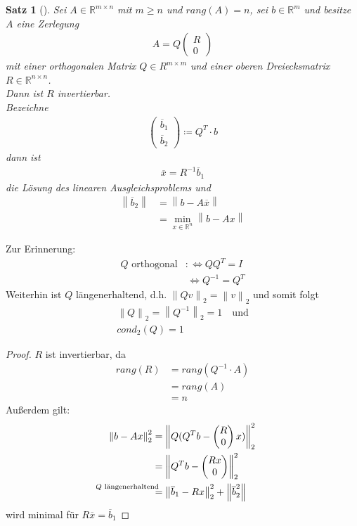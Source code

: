 \documentclass[ngerman,fontsize=11pt, paper=a4, parskip=half, titlepage=true, toc=bib]{scrbook}
\theoremstyle{definition}
\theoremstyle{plain}
\newtheorem{Satz}[Def]{Satz}		%
\newcommand{\R}{\mathds{R}}
\newcommand{\Ren}{\mathds{R}^{n}}
\newcommand{\nn}[1]{\left\| #1 \right\|}
\newcommand{\subsectione}[1]{\addtocounter{Def}{1}\subsection{#1}}
\newenvironment{Satze}[1][]{ %
	\begin{Satz}[#1]
}
{
	\end{Satz}
	\addtocounter{subsection}{1}
}
\begin{document}
  
\begin{Satze}
	Sei $A\in \R^{m\times n} $ mit $m\geq n$ und $rang(A) = n$,
	sei $b\in\R^m$ und besitze $A$ eine Zerlegung
	\begin{gather*}
	A= Q\begin{pmatrix}R\\0\end{pmatrix}
	\end{gather*}
	mit einer orthogonalen Matrix $Q\in R^{m\times m}$ und 
	einer oberen Dreiecksmatrix $R\in \R^{n\times n}$. \\
	Dann ist $R$ invertierbar. \\
	Bezeichne 
	\begin{gather}
	\begin{pmatrix} \overline{b}_1 \\ \overline{b}_2\end{pmatrix}
	\coloneqq Q^T\cdot b
	\label{IV.3.9}
	\end{gather}
	dann ist
	\begin{gather}
	\overline{x} = R^{-1} \overline{b}_1 
	\label{IV.3.10}
	\end{gather}
	die Lösung des linearen Ausgleichsproblems und
	\begin{align*}
	\nn{\overline{b}_2} &= \nn{b-A\overline{x}} \\
	& = \min_{x\in \Ren }\nn{b-Ax}
	\end{align*}
 \end{Satze}

	Zur Erinnerung:
	\begin{align*}
	Q \text{ orthogonal} &:\Leftrightarrow QQ^T = I \\
	&\, \Leftrightarrow Q^{-1} = Q^T
	\end{align*}
	Weiterhin ist $Q$ längenerhaltend, d.h. $\nn{Qv}_2 = \nn{v}_2$ 
	und somit folgt
	\begin{gather}
	\nonumber
	\nn{Q}_2 = \nn{Q^{-1}}_2 = 1 \quad \text{und} \\
	cond_2(Q) = 1
	\label{IV.3.11}
	\end{gather}
	
	\begin{proof} $R$ ist invertierbar, da 
		\begin{align*}
		rang(R) &= rang(Q^{-1}\cdot A) \\	
		& = rang(A) \\
		&= n
		\end{align*}
		Außerdem gilt:
		\begin{align*}
		\nn{b-Ax}_2^2 & = \nn{Q(Q^Tb-\begin{pmatrix}R\\0\end{pmatrix}x)}_2^2 \\
		&=  \nn{Q^Tb-\begin{pmatrix}Rx\\0\end{pmatrix}}_2^2  \\
		&\overset{\mathllap{\text{$Q$ längenerhaltend}}}{=}
		\nn{\overline{b}_1 - Rx}_2^2  + \nn{\overline{b}_2^2}
		\end{align*}
		wird minimal für $R\overline{x} = \overline{b}_1$
	\end{proof}
  
\end{document}
